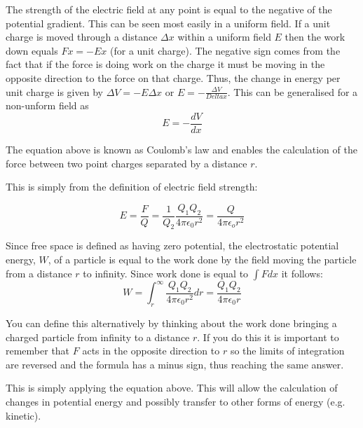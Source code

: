 \documentclass[main.tex]{subfiles}
\begin{document}

The strength of the electric field at any point is equal to the negative of the potential gradient. This can be seen most easily in a uniform field. If a unit charge is moved through a distance $\Delta x$ within a uniform field $E$ then the work down equals $Fx = -Ex$ (for a unit charge). The negative sign comes from the fact that if the force is doing work on the charge it must be moving in the opposite direction to the force on that charge. Thus, the change in energy per unit charge is given by $\Delta V = -E\Delta x$ or $E = -\frac{\Delta V}{Delta x}$. This can be generalised for a non-unform field as
\[ E = - \frac{dV}{dx} \]


The equation above is known as Coulomb's law and enables the calculation of the force between two point charges separated by a distance $r$.


This is simply from the definition of electric field strength:

\[ E = \frac{F}{Q} = \frac{1}{Q_2} \frac{Q_1 Q_2}{4\pi\epsilon_0 r^2} = \frac{Q}{4\pi\epsilon_o r^2} \]


Since free space is defined as having zero potential, the electrostatic potential energy, $W$, of a particle is equal to the work done by the field moving the particle from a distance $r$ to infinity. Since work done is equal to $\int F dx$ it follows:
\[ W = \int_{r}^\infty \frac{Q_1 Q_2}{4\pi\epsilon_0 r^2} dr = \frac{Q_1 Q_2}{4\pi\epsilon_0 r}\]

You can define this alternatively by thinking about the work done bringing a charged particle from infinity to a distance $r$. If you do this it is important to remember that $F$ acts in the opposite direction to $r$ so the limits of integration are reversed and the formula has a minus sign, thus reaching the same answer.


This is simply applying the equation above. This will allow the calculation of changes in potential energy and possibly transfer to other forms of energy (e.g. kinetic).
\end{document}
